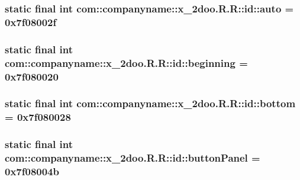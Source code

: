 \hypertarget{classcom_1_1companyname_1_1x__2doo_1_1_r_1_1id_69964464884b34d6d95b6b911a7bb3b8}{
\subsubsection[{auto}]{\setlength{\rightskip}{0pt plus 5cm}static final int com::companyname::x\_\-2doo.R.R::id::auto = 0x7f08002f}}
\label{classcom_1_1companyname_1_1x__2doo_1_1_r_1_1id_69964464884b34d6d95b6b911a7bb3b8}


\hypertarget{classcom_1_1companyname_1_1x__2doo_1_1_r_1_1id_4b6bdcbf27f03227f7a1da3258c93e9a}{
\subsubsection[{beginning}]{\setlength{\rightskip}{0pt plus 5cm}static final int com::companyname::x\_\-2doo.R.R::id::beginning = 0x7f080020}}
\label{classcom_1_1companyname_1_1x__2doo_1_1_r_1_1id_4b6bdcbf27f03227f7a1da3258c93e9a}


\hypertarget{classcom_1_1companyname_1_1x__2doo_1_1_r_1_1id_9db61d1d3e200c18f6756be43d3d5789}{
\subsubsection[{bottom}]{\setlength{\rightskip}{0pt plus 5cm}static final int com::companyname::x\_\-2doo.R.R::id::bottom = 0x7f080028}}
\label{classcom_1_1companyname_1_1x__2doo_1_1_r_1_1id_9db61d1d3e200c18f6756be43d3d5789}


\hypertarget{classcom_1_1companyname_1_1x__2doo_1_1_r_1_1id_e9889347622c9f36d66912788577817e}{
\subsubsection[{buttonPanel}]{\setlength{\rightskip}{0pt plus 5cm}static final int com::companyname::x\_\-2doo.R.R::id::buttonPanel = 0x7f08004b}}
\label{classcom_1_1companyname_1_1x__2doo_1_1_r_1_1id_e9889347622c9f36d66912788577817e}


